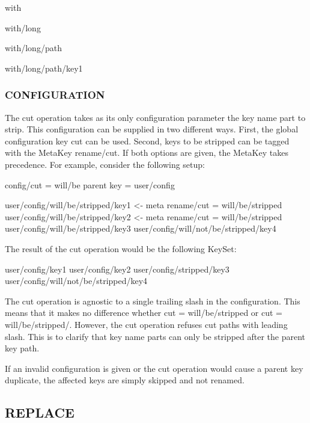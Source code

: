 \begin{DoxyItemize}
\item with
\item with/long
\item with/long/path
\item with/long/path/key1
\end{DoxyItemize}

\subsubsection*{C\+O\+N\+F\+I\+G\+U\+R\+A\+T\+I\+O\+N}

The cut operation takes as its only configuration parameter the key name part to strip. This configuration can be supplied in two different ways. First, the global configuration key {\ttfamily cut} can be used. Second, keys to be stripped can be tagged with the Meta\+Key {\ttfamily rename/cut}. If both options are given, the Meta\+Key takes precedence. For example, consider the following setup\+: \begin{DoxyVerb}    config/cut = will/be
    parent key = user/config

    user/config/will/be/stripped/key1               <- meta rename/cut = will/be/stripped
    user/config/will/be/stripped/key2               <- meta rename/cut = will/be/stripped
    user/config/will/be/stripped/key3
    user/config/will/not/be/stripped/key4
\end{DoxyVerb}


The result of the cut operation would be the following Key\+Set\+: \begin{DoxyVerb}    user/config/key1
    user/config/key2
    user/config/stripped/key3
    user/config/will/not/be/stripped/key4
\end{DoxyVerb}


The cut operation is agnostic to a single trailing slash in the configuration. This means that it makes no difference whether {\ttfamily cut = will/be/stripped} or {\ttfamily cut = will/be/stripped/}. However, the cut operation refuses cut paths with leading slash. This is to clarify that key name parts can only be stripped after the parent key path.

If an invalid configuration is given or the cut operation would cause a parent key duplicate, the affected keys are simply skipped and not renamed.

\subsection*{R\+E\+P\+L\+A\+C\+E}

